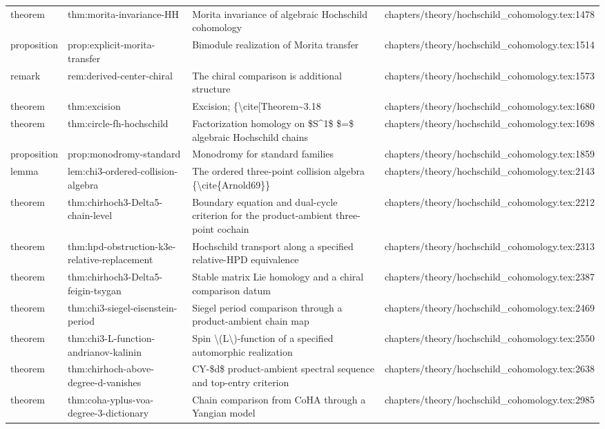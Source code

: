 \documentclass[11pt]{article}
\begin{document}
\begin{longtable}{L{0.10\textwidth}L{0.26\textwidth}L{0.42\textwidth}L{0.22\textwidth}}
theorem & thm:morita-invariance-HH & Morita invariance of algebraic Hochschild cohomology & chapters/theory/hochschild\_cohomology.tex:1478\\
proposition & prop:explicit-morita-transfer & Bimodule realization of Morita transfer & chapters/theory/hochschild\_cohomology.tex:1514\\
remark & rem:derived-center-chiral & The chiral comparison is additional structure & chapters/theory/hochschild\_cohomology.tex:1573\\
theorem & thm:excision & Excision; \{\textbackslash{}cite[Theorem\textasciitilde{}3.18 & chapters/theory/hochschild\_cohomology.tex:1680\\
theorem & thm:circle-fh-hochschild & Factorization homology on \$S\textasciicircum{}1\$ \$=\$ algebraic Hochschild chains & chapters/theory/hochschild\_cohomology.tex:1698\\
proposition & prop:monodromy-standard & Monodromy for standard families & chapters/theory/hochschild\_cohomology.tex:1859\\
lemma & lem:chi3-ordered-collision-algebra & The ordered three-point collision algebra \{\textbackslash{}cite\{Arnold69\}\} & chapters/theory/hochschild\_cohomology.tex:2143\\
theorem & thm:chirhoch3-Delta5-chain-level & Boundary equation and dual-cycle criterion for the product-ambient three-point cochain & chapters/theory/hochschild\_cohomology.tex:2212\\
theorem & thm:hpd-obstruction-k3e-relative-replacement & Hochschild transport along a specified relative-HPD equivalence & chapters/theory/hochschild\_cohomology.tex:2313\\
theorem & thm:chirhoch3-Delta5-feigin-tsygan & Stable matrix Lie homology and a chiral comparison datum & chapters/theory/hochschild\_cohomology.tex:2387\\
theorem & thm:chi3-siegel-eisenstein-period & Siegel period comparison through a product-ambient chain map & chapters/theory/hochschild\_cohomology.tex:2469\\
theorem & thm:chi3-L-function-andrianov-kalinin & Spin \textbackslash{}(L\textbackslash{})-function of a specified automorphic realization & chapters/theory/hochschild\_cohomology.tex:2550\\
theorem & thm:chirhoch-above-degree-d-vanishes & CY-\$d\$ product-ambient spectral sequence and top-entry criterion & chapters/theory/hochschild\_cohomology.tex:2638\\
theorem & thm:coha-yplus-voa-degree-3-dictionary & Chain comparison from CoHA through a Yangian model & chapters/theory/hochschild\_cohomology.tex:2985\\

\end{longtable}
\end{document}
